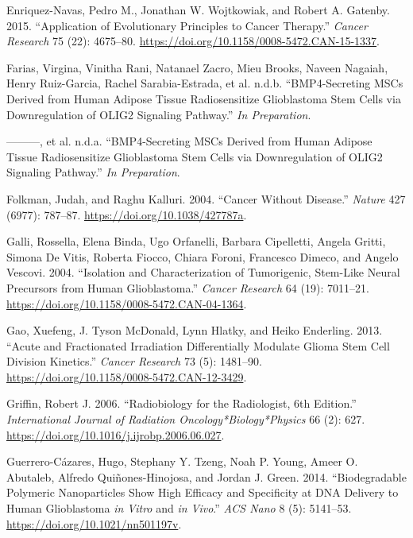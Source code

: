 \documentclass[
  letterpaper,
]{scrreprt}
\newlength{\cslhangindent}
\newenvironment{CSLReferences}[2] %
 {\begin{list}{}{%
  \setlength{\itemindent}{0pt}
  \setlength{\leftmargin}{0pt}
  \setlength{\parsep}{0pt}
  \ifodd #1
   \setlength{\leftmargin}{\cslhangindent}
   \setlength{\itemindent}{-1\cslhangindent}
  \fi
  \setlength{\itemsep}{#2\baselineskip}}}
 {\end{list}}
\theoremstyle{definition}
\theoremstyle{remark}
\begin{document}
\begin{CSLReferences}{1}{0}
Enriquez-Navas, Pedro M., Jonathan W. Wojtkowiak, and Robert A. Gatenby.
2015. {``Application of Evolutionary Principles to Cancer Therapy.''}
\emph{Cancer Research} 75 (22): 4675--80.
\url{https://doi.org/10.1158/0008-5472.CAN-15-1337}.

Farias, Virgina, Vinitha Rani, Natanael Zacro, Mieu Brooks, Naveen
Nagaiah, Henry Ruiz-Garcia, Rachel Sarabia-Estrada, et al. n.d.b.
{``BMP4-Secreting MSCs Derived from Human Adipose Tissue Radiosensitize
Glioblastoma Stem Cells via Downregulation of OLIG2 Signaling
Pathway.''} \emph{In Preparation}.

---------, et al. n.d.a. {``BMP4-Secreting MSCs Derived from Human
Adipose Tissue Radiosensitize Glioblastoma Stem Cells via Downregulation
of OLIG2 Signaling Pathway.''} \emph{In Preparation}.

Folkman, Judah, and Raghu Kalluri. 2004. {``Cancer Without Disease.''}
\emph{Nature} 427 (6977): 787--87.
\url{https://doi.org/10.1038/427787a}.

Galli, Rossella, Elena Binda, Ugo Orfanelli, Barbara Cipelletti, Angela
Gritti, Simona De Vitis, Roberta Fiocco, Chiara Foroni, Francesco
Dimeco, and Angelo Vescovi. 2004. {``Isolation and Characterization of
Tumorigenic, Stem-Like Neural Precursors from Human Glioblastoma.''}
\emph{Cancer Research} 64 (19): 7011--21.
\url{https://doi.org/10.1158/0008-5472.CAN-04-1364}.

Gao, Xuefeng, J. Tyson McDonald, Lynn Hlatky, and Heiko Enderling. 2013.
{``Acute and Fractionated Irradiation Differentially Modulate Glioma
Stem Cell Division Kinetics.''} \emph{Cancer Research} 73 (5): 1481--90.
\url{https://doi.org/10.1158/0008-5472.CAN-12-3429}.

Griffin, Robert J. 2006. {``Radiobiology for the Radiologist, 6th
Edition.''} \emph{International Journal of Radiation
Oncology*Biology*Physics} 66 (2): 627.
\url{https://doi.org/10.1016/j.ijrobp.2006.06.027}.

Guerrero-Cázares, Hugo, Stephany Y. Tzeng, Noah P. Young, Ameer O.
Abutaleb, Alfredo Quiñones-Hinojosa, and Jordan J. Green. 2014.
{``Biodegradable Polymeric Nanoparticles Show High Efficacy and
Specificity at DNA Delivery to Human Glioblastoma {\emph{in Vitro}} and
{\emph{in Vivo}}.''} \emph{ACS Nano} 8 (5): 5141--53.
\url{https://doi.org/10.1021/nn501197v}.


\end{CSLReferences}
\end{document}
